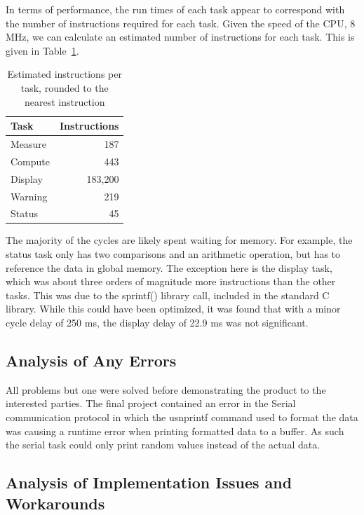 \documentclass[12pt]{article} %
\begin{document}
    In terms of performance, the run times of each task appear to correspond with
    the number of instructions required for each task. Given the speed of the CPU,
    8 MHz, we can calculate an estimated number of instructions for each task.
    This is given in Table~\ref{tab:instr}.
    \begin{table}[h]
      \centering
      \begin{tabular}{|l|r|} 
	\hline
	Task & Instructions \\ \hline
	Measure & 187 \\ \hline
	Compute & 443 \\ \hline
	Display & 183,200 \\ \hline
	Warning & 219 \\ \hline
	Status & 45 \\ \hline
      \end{tabular}
      \caption{Estimated instructions per task, rounded to the nearest instruction}
      \label{tab:instr}
    \end{table}
    The majority of the cycles are likely spent waiting for memory. For example,
    the status task only has two comparisons and an arithmetic operation, but has
    to reference the data in global memory. The exception here is the display
    task, which was about three orders of magnitude more instructions than the
    other tasks. This was due to the sprintf() library call, included in the
    standard C library. While this could have been optimized, it was found that
    with a minor cycle delay of 250 ms, the display delay of 22.9 ms was not
    significant.


    \subsection{Analysis of Any Errors}
   All problems but one were solved before demonstrating the product to the interested
	parties. The final project contained an error in the Serial communication protocol in which the usnprintf command used to format the data was causing a runtime error when printing formatted data to a buffer. As such the serial task could only print random values instead of the actual data.

    \subsection{Analysis of Implementation Issues and Workarounds}

\end{document}
